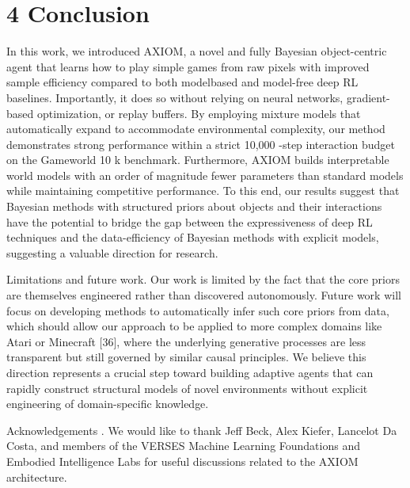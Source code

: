 \documentclass[10pt]{article}
\begin{document}
\section*{4 Conclusion}
In this work, we introduced AXIOM, a novel and fully Bayesian object-centric agent that learns how to play simple games from raw pixels with improved sample efficiency compared to both modelbased and model-free deep RL baselines. Importantly, it does so without relying on neural networks, gradient-based optimization, or replay buffers. By employing mixture models that automatically expand to accommodate environmental complexity, our method demonstrates strong performance within a strict 10,000 -step interaction budget on the Gameworld 10 k benchmark. Furthermore, AXIOM builds interpretable world models with an order of magnitude fewer parameters than standard models while maintaining competitive performance. To this end, our results suggest that Bayesian methods with structured priors about objects and their interactions have the potential to bridge the gap between the expressiveness of deep RL techniques and the data-efficiency of Bayesian methods with explicit models, suggesting a valuable direction for research.

Limitations and future work. Our work is limited by the fact that the core priors are themselves engineered rather than discovered autonomously. Future work will focus on developing methods to automatically infer such core priors from data, which should allow our approach to be applied to more complex domains like Atari or Minecraft [36], where the underlying generative processes are less transparent but still governed by similar causal principles. We believe this direction represents a crucial step toward building adaptive agents that can rapidly construct structural models of novel environments without explicit engineering of domain-specific knowledge.

Acknowledgements . We would like to thank Jeff Beck, Alex Kiefer, Lancelot Da Costa, and members of the VERSES Machine Learning Foundations and Embodied Intelligence Labs for useful discussions related to the AXIOM architecture.
\end{document}
